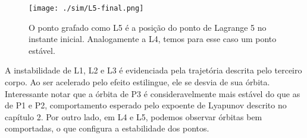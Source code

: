 \begin{figure}[H]
\centering
\texttt{[image: ./sim/L5-final.png]}
\caption{O ponto grafado como L5 é a posição do ponto de Lagrange 5 no instante inicial. Analogamente a L4, temos para esse caso um ponto estável.}
\end{figure}

   A instabilidade de L1, L2 e L3 é evidenciada pela trajetória descrita pelo terceiro corpo. Ao ser acelerado pelo efeito estilingue, ele se desvia de sua órbita. Interessante notar que a órbita de P3 é consideravelmente mais estável do que as de P1 e P2, comportamento esperado pelo expoente de Lyapunov descrito no capítulo 2. Por outro lado, em L4 e L5, podemos observar órbitas bem comportadas, o que configura a estabilidade dos pontos.
